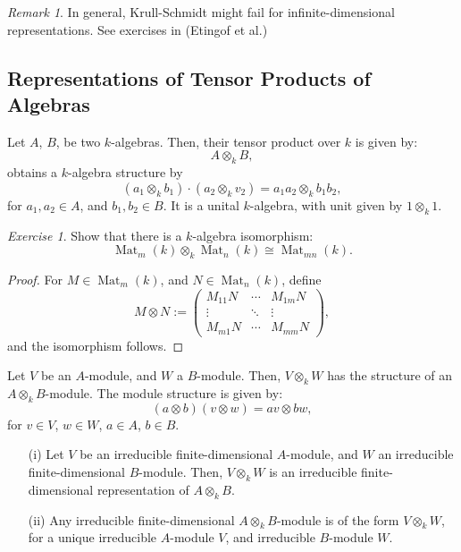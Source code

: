 \documentclass[a4paper]{report}
\theoremstyle{definition}
\theoremstyle{remark}
\newtheorem{remark}{Remark}
\theoremstyle{proposition}
\theoremstyle{conjecture}
\theoremstyle{lemma}
\theoremstyle{corollary}
\theoremstyle{exercise}
\newtheorem{exercise}{Exercise}
\theoremstyle{example}
\newcommand{\on}{\operatorname}
\begin{document}
\begin{remark}
    In general, Krull-Schmidt might fail for infinite-dimensional 
    representations. See exercises in (Etingof et al.)
\end{remark}

\subsection{Representations of Tensor Products of Algebras}

Let $A$, $B$, be two $k$-algebras. Then, their tensor product over $k$
is given by:
$$A\otimes_kB,$$
obtains a $k$-algebra structure by 
$$(a_1\otimes_kb_1)\cdot (a_2\otimes_kv_2) = a_1a_2\otimes_kb_1b_2,$$
for $a_1,a_2 \in A$, and $b_1,b_2\in B$. It is a unital 
$k$-algebra, with unit given by $1\otimes_k1$.

\begin{exercise}
    Show that there is a $k$-algebra isomorphism:
    $$\on{Mat}_m(k) \otimes_k\on{Mat}_n(k) \cong \on{Mat}_{mn}(k).$$
\end{exercise}

\begin{proof}
    For $M \in \on{Mat}_m(k)$, and $N \in \on{Mat}_n(k)$, define
    $$M\otimes N := \begin{pmatrix}
        M_{11} N & \cdots & M_{1m}N\\
        \vdots & \ddots & \vdots\\
        M_{m1}N & \cdots & M_{mm}N
    \end{pmatrix},$$
    and the isomorphism follows.
\end{proof}

Let $V$ be an $A$-module, and $W$ a $B$-module.
Then, $V\otimes_kW$ has the structure of an $A\otimes_kB$-module.
The module structure is given by:
$$(a\otimes b)(v\otimes w) = av\otimes bw,$$
for $v\in V$, $w\in W$, $a\in A$, $b\in B$.

\begin{theorem}\label{thm28}
    \leavevmode
    \begin{itemize}
        \item[(i)] Let $V$ be an irreducible finite-dimensional $A$-module,
            and $W$ an irreducible finite-dimensional $B$-module.
            Then, $V\otimes_kW$ is an irreducible finite-dimensional
            representation of $A\otimes_kB$.
        \item[(ii)] Any irreducible finite-dimensional $A\otimes_kB$-module
            is of the form $V\otimes_kW$, for a unique irreducible $A$-module
            $V$, and irreducible $B$-module $W$.
    \end{itemize}
\end{theorem}
\end{document}
